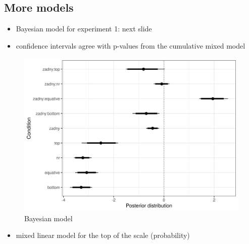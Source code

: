 \documentclass[
  letterpaper,
  DIV=11,
  numbers=noendperiod]{scrartcl}
\providecommand{\tightlist}{%
  \setlength{\itemsep}{0pt}\setlength{\parskip}{0pt}}\usepackage{longtable,booktabs,array}
\begin{document}
\hypertarget{more-models}{%
\subsection{More models}\label{more-models}}

\begin{itemize}
\tightlist
\item
  Bayesian model for experiment 1: next slide
\item
  confidence intervals agree with p-values from the cumulative mixed
  model
\end{itemize}

\begin{figure}

{\centering \includegraphics{"acc-results-complex.png"}

}

\caption{Bayesian model}

\end{figure}

\begin{itemize}
\tightlist
\item
  mixed linear model for the top of the scale (probability)
\end{itemize}

\footnotesize
\end{document}
